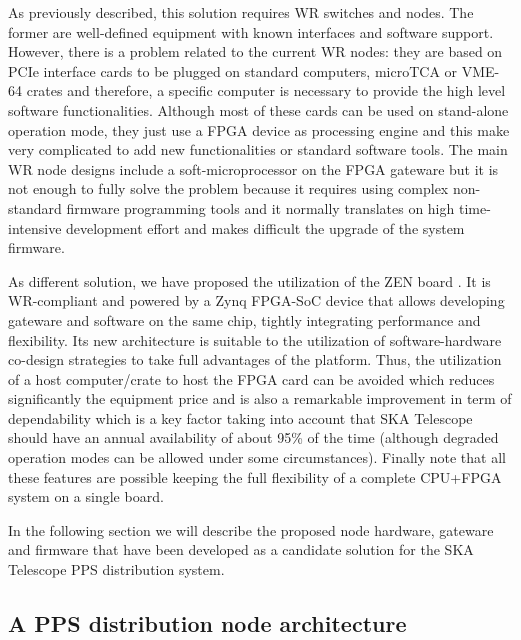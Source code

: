 As previously described, this solution requires WR switches and nodes. The 
former are well-defined equipment with known interfaces and software support. 
However, there is a problem related to the current WR nodes: they are based on 
PCIe interface cards to be plugged on standard computers, microTCA or VME-64 
crates and therefore, a specific computer is necessary to provide the high 
level software functionalities. Although most of these cards can be used on 
stand-alone operation mode, they just use a FPGA device as processing engine 
and this make very complicated to add new functionalities or standard software 
tools. The main WR node designs include a soft-microprocessor on the FPGA gateware but it is not 
enough to fully solve the problem because it requires using complex 
non-standard firmware programming tools and it normally translates on high 
time-intensive development effort and makes difficult the upgrade of the system 
firmware.

As different solution, we have proposed the utilization of the ZEN board 
\cite{sevensols:wr_zen}. It is WR-compliant and powered by a Zynq FPGA-SoC device \cite{xilinx:zynq} that allows developing 
gateware and software on the same chip, tightly integrating performance and 
flexibility. Its new architecture is suitable to the utilization of 
software-hardware co-design strategies to take full advantages of the platform. 
Thus, the utilization of a host computer/crate to host the FPGA card can be avoided which reduces significantly the equipment price and is also a remarkable improvement in term of dependability which is a key factor taking into account that SKA Telescope should have an annual availability of about 95\% of the time (although degraded operation modes can be allowed under some circumstances).
Finally note that all these features are possible keeping the full flexibility of a complete CPU+FPGA system on a single board. 

In the following section we will describe the proposed node hardware, gateware and firmware that have been developed as a candidate solution for the SKA Telescope PPS distribution system. 

\subsection{A PPS distribution node architecture}


